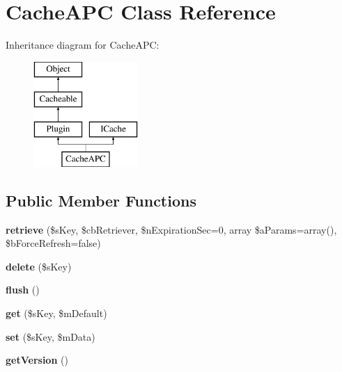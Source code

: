 \hypertarget{class_cache_a_p_c}{\section{Cache\-A\-P\-C Class Reference}
\label{class_cache_a_p_c}
}
Inheritance diagram for Cache\-A\-P\-C\-:\begin{figure}[H]
\begin{center}
\leavevmode
\includegraphics[height=4.000000cm]{class_cache_a_p_c}
\end{center}
\end{figure}
\subsection*{Public Member Functions}
\begin{DoxyCompactItemize}
\item 
\hypertarget{class_cache_a_p_c_a5a0402e5b69ac4c8ecbe2cb440cac16a}{{\bfseries retrieve} (\$s\-Key, \$cb\-Retriever, \$n\-Expiration\-Sec=0, array \$a\-Params=array(), \$b\-Force\-Refresh=false)}\label{class_cache_a_p_c_a5a0402e5b69ac4c8ecbe2cb440cac16a}

\item 
\hypertarget{class_cache_a_p_c_a54b518ddcb780ceb44373816c4962c84}{{\bfseries delete} (\$s\-Key)}\label{class_cache_a_p_c_a54b518ddcb780ceb44373816c4962c84}

\item 
\hypertarget{class_cache_a_p_c_a854bf5d2eed4a8b970df1170097164e2}{{\bfseries flush} ()}\label{class_cache_a_p_c_a854bf5d2eed4a8b970df1170097164e2}

\item 
\hypertarget{class_cache_a_p_c_a97c473f41a492fcd8362a23b0c8db39b}{{\bfseries get} (\$s\-Key, \$m\-Default)}\label{class_cache_a_p_c_a97c473f41a492fcd8362a23b0c8db39b}

\item 
\hypertarget{class_cache_a_p_c_aaf2aaadeb85022cd3599374814731748}{{\bfseries set} (\$s\-Key, \$m\-Data)}\label{class_cache_a_p_c_aaf2aaadeb85022cd3599374814731748}

\item 
\hypertarget{class_cache_a_p_c_acca4e18295d59cab00ffbb32c6b9ac89}{{\bfseries get\-Version} ()}\label{class_cache_a_p_c_acca4e18295d59cab00ffbb32c6b9ac89}

\end{DoxyCompactItemize}
